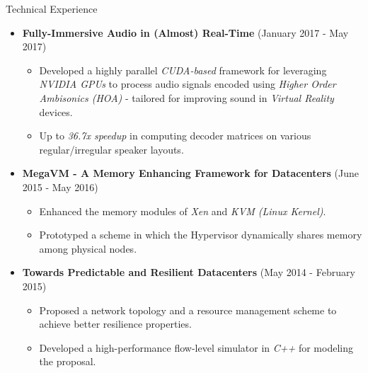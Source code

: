 \documentclass[]{Gohar_CV_Jobs}
\begin{document}
    \begin{cvsection}{Technical Experience}
        \begin{cvsubsection}{}{}{}
            \begin{itemize}
            	\item \textbf{Fully-Immersive Audio in (Almost) Real-Time} \hfill(January 2017 - May 2017) 
                    \begin{itemize}
                        \item Developed a highly parallel \textit{CUDA-based} framework for leveraging \textit{NVIDIA GPUs} to process audio signals encoded using \textit{Higher Order Ambisonics (HOA)} - tailored for improving sound in \textit{Virtual Reality} devices.
                        \item Up to \textit{36.7x speedup} in computing decoder matrices on various regular/irregular speaker layouts.
                    \end{itemize}
                \item \textbf{MegaVM - A Memory Enhancing Framework for Datacenters} \hfill(June 2015 - May 2016)
                    \begin{itemize}
                        \item Enhanced the memory modules of \textit{Xen} and \textit{KVM (Linux Kernel)}. 
                        \item Prototyped a scheme in which the Hypervisor dynamically shares memory among physical nodes.
                    \end{itemize}
                
                \item \textbf{Towards Predictable and Resilient Datacenters} \hfill(May 2014 - February 2015) 
                    \begin{itemize}
                        \item Proposed a network topology and a resource management scheme to achieve better resilience properties. 
                        \item Developed a high-performance flow-level simulator in \textit{C++} for modeling the proposal.
                    \end{itemize}
            \end{itemize}
        \end{cvsubsection}
    \end{cvsection}
    
\end{document}
